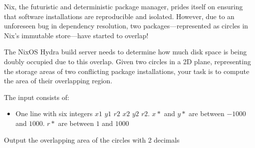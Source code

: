\problemname{}


\newcommand{\maxa}{123456789}

Nix, the futuristic and deterministic package manager, prides itself on ensuring that software installations are reproducible and isolated. However, due to an unforeseen bug in dependency resolution, two packages—represented as circles in Nix’s immutable store—have started to overlap!

The NixOS Hydra build server needs to determine how much disk space is being doubly occupied due to this overlap. Given two circles in a 2D plane, representing the storage areas of two conflicting package installations, your task is to compute the area of their overlapping region.

\begin{Input}
    The input consists of:
    \begin{itemize}
        \item One line with six integers $x1$ $y1$ $r2$ $x2$ $y2$ $r2$. $x*$ and $y*$ are between $-1000$ and $1000$. $r*$ are between $1$ and $1000$
    \end{itemize}
\end{Input}

\begin{Output}
    Output the overlapping area of the circles with 2 decimals
\end{Output}

